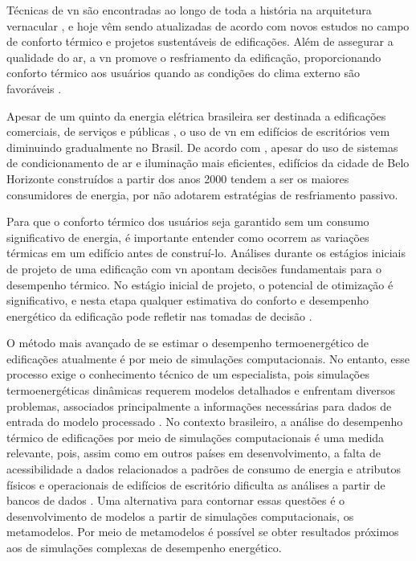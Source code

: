\documentclass[brazil,hardcopy,openany]{ufscthesis} %
\begin{document}
Técnicas de \acrshort{vn} são encontradas ao longo de toda a história na arquitetura vernacular \cite{Pesic2018}, e hoje vêm sendo atualizadas de acordo com novos estudos no campo de conforto térmico e projetos sustentáveis de edificações.
Além de assegurar a qualidade do ar, a \acrshort{vn} promove o resfriamento da edificação, proporcionando conforto térmico aos usuários quando as condições do clima externo são favoráveis \cite{Yao2009}.

Apesar de um quinto da energia elétrica brasileira ser destinada a edificações comerciais, de serviços e públicas \cite{EPE2018}, o uso de \acrshort{vn} em edifícios de escritórios vem diminuindo gradualmente no Brasil. De acordo com , apesar do uso de sistemas de condicionamento de ar e iluminação mais eficientes, edifícios da cidade de Belo Horizonte construídos a partir dos anos 2000 tendem a ser os maiores consumidores de energia, por não adotarem estratégias de resfriamento passivo.

Para que o conforto térmico dos usuários seja garantido sem um consumo significativo de energia, é importante entender como ocorrem as variações térmicas em um edifício antes de construí-lo. Análises durante os estágios iniciais de projeto de uma edificação com \acrshort{vn} apontam decisões fundamentais para o desempenho térmico. No estágio inicial de projeto, o potencial de otimização é significativo, e nesta etapa qualquer estimativa do conforto e desempenho energético da edificação pode refletir nas tomadas de decisão \cite{Belleri2014, Roetzel2014}.

O método mais avançado de se estimar o desempenho termoenergético de edificações atualmente é por meio de simulações computacionais. No entanto, esse processo exige o conhecimento técnico de um especialista, pois simulações termoenergéticas dinâmicas requerem modelos detalhados e enfrentam diversos problemas, associados principalmente a informações necessárias para dados de entrada do modelo processado \cite{Corgnati2013}. No contexto brasileiro, a análise do desempenho térmico de edificações por meio de simulações computacionais é uma medida relevante, pois, assim como em outros países em desenvolvimento, a falta de acessibilidade a dados relacionados a padrões de consumo de energia e atributos físicos e operacionais de edifícios de escritório dificulta as análises a partir de bancos de dados \cite{Alves2018}. Uma alternativa para contornar essas questões é o desenvolvimento de modelos a partir de simulações computacionais, os metamodelos. Por meio de metamodelos é possível se obter resultados próximos aos de simulações complexas de desempenho energético.
\end{document}
